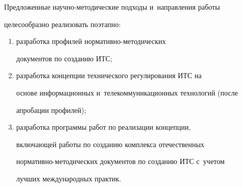       


      Предложенные научно-методические подходы и~направления работы 


целесообразно реализовать поэтапно:


      \begin{enumerate}[(1)]


      \item разработка профилей нор\-ма\-тив\-но-ме\-то\-ди\-че\-ских 


документов по созданию ИТС;


      \item разработка концепции технического регулирования ИТС на 


основе информационных и~телекоммуникационных технологий (после 


апробации профилей);


      \item разработка программы работ по реализации концепции, 


включающей работы по созданию комплекса отечественных  


нор\-ма\-тив\-но-ме\-то\-ди\-че\-ских документов по созданию ИТС с~учетом 


лучших международных практик. 


      \end{enumerate}


      


      \vspace*{-6pt}


      


      


